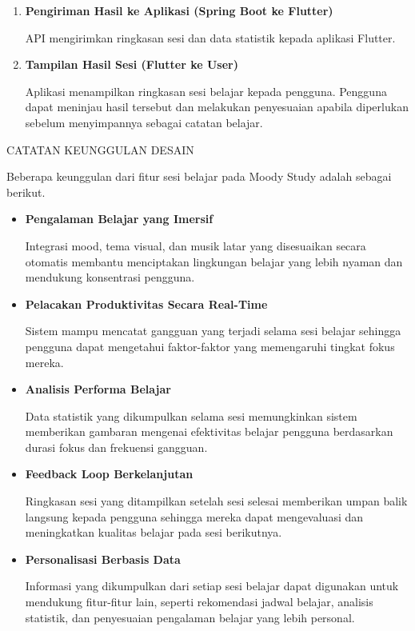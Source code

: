 \documentclass[11pt]{article}
\begin{document}
\begin{enumerate}
Berdasarkan data yang telah dikumpulkan selama sesi berlangsung, sistem membuat ringkasan hasil belajar yang berisi informasi mengenai performa dan aktivitas pengguna.

\item \textbf{Pengiriman Hasil ke Aplikasi (Spring Boot ke Flutter)}

API mengirimkan ringkasan sesi dan data statistik kepada aplikasi Flutter.

\item \textbf{Tampilan Hasil Sesi (Flutter ke User)}

Aplikasi menampilkan ringkasan sesi belajar kepada pengguna. Pengguna dapat meninjau hasil tersebut dan melakukan penyesuaian apabila diperlukan sebelum menyimpannya sebagai catatan belajar.

\end{enumerate}

CATATAN KEUNGGULAN DESAIN

Beberapa keunggulan dari fitur sesi belajar pada Moody Study adalah sebagai berikut.

\begin{itemize}

\item \textbf{Pengalaman Belajar yang Imersif}

Integrasi mood, tema visual, dan musik latar yang disesuaikan secara otomatis membantu menciptakan lingkungan belajar yang lebih nyaman dan mendukung konsentrasi pengguna.

\item \textbf{Pelacakan Produktivitas Secara Real-Time}

Sistem mampu mencatat gangguan yang terjadi selama sesi belajar sehingga pengguna dapat mengetahui faktor-faktor yang memengaruhi tingkat fokus mereka.

\item \textbf{Analisis Performa Belajar}

Data statistik yang dikumpulkan selama sesi memungkinkan sistem memberikan gambaran mengenai efektivitas belajar pengguna berdasarkan durasi fokus dan frekuensi gangguan.

\item \textbf{Feedback Loop Berkelanjutan}

Ringkasan sesi yang ditampilkan setelah sesi selesai memberikan umpan balik langsung kepada pengguna sehingga mereka dapat mengevaluasi dan meningkatkan kualitas belajar pada sesi berikutnya.

\item \textbf{Personalisasi Berbasis Data}

Informasi yang dikumpulkan dari setiap sesi belajar dapat digunakan untuk mendukung fitur-fitur lain, seperti rekomendasi jadwal belajar, analisis statistik, dan penyesuaian pengalaman belajar yang lebih personal.

\end{itemize}
\end{document}

